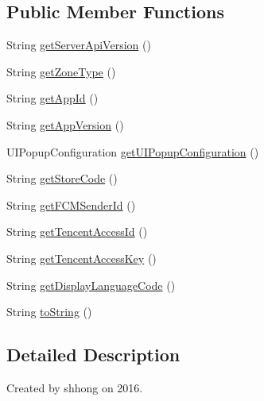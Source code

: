 \subsection*{Public Member Functions}
\begin{DoxyCompactItemize}
\item 
String \hyperlink{classcom_1_1toast_1_1android_1_1gamebase_1_1_gamebase_configuration_af74623fc60ebad6b08ba78668d4961cc}{get\+Server\+Api\+Version} ()
\item 
String \hyperlink{classcom_1_1toast_1_1android_1_1gamebase_1_1_gamebase_configuration_ae87f638a781db3f92a0bbe89bd3a611f}{get\+Zone\+Type} ()
\item 
String \hyperlink{classcom_1_1toast_1_1android_1_1gamebase_1_1_gamebase_configuration_a240d4abd81a68efe7d3b9e10537763f5}{get\+App\+Id} ()
\item 
String \hyperlink{classcom_1_1toast_1_1android_1_1gamebase_1_1_gamebase_configuration_a5344eff846b91c2a48847886ee73800f}{get\+App\+Version} ()
\item 
U\+I\+Popup\+Configuration \hyperlink{classcom_1_1toast_1_1android_1_1gamebase_1_1_gamebase_configuration_a4d2e405317c20f14c144b6748a6e998a}{get\+U\+I\+Popup\+Configuration} ()
\item 
String \hyperlink{classcom_1_1toast_1_1android_1_1gamebase_1_1_gamebase_configuration_ac53dc9a5d7c5e8a4aa816b4476a8c93f}{get\+Store\+Code} ()
\item 
String \hyperlink{classcom_1_1toast_1_1android_1_1gamebase_1_1_gamebase_configuration_a16a632ddb686090e7c21ecdc727414eb}{get\+F\+C\+M\+Sender\+Id} ()
\item 
String \hyperlink{classcom_1_1toast_1_1android_1_1gamebase_1_1_gamebase_configuration_ad3bd019dea776f3b49d1f7f3e0fe2157}{get\+Tencent\+Access\+Id} ()
\item 
String \hyperlink{classcom_1_1toast_1_1android_1_1gamebase_1_1_gamebase_configuration_ac3f77aa86c99c8d53555859211a9f76d}{get\+Tencent\+Access\+Key} ()
\item 
String \hyperlink{classcom_1_1toast_1_1android_1_1gamebase_1_1_gamebase_configuration_a2cbab9a001e124c2ad4b9815db0f3012}{get\+Display\+Language\+Code} ()
\item 
String \hyperlink{classcom_1_1toast_1_1android_1_1gamebase_1_1_gamebase_configuration_ad146fa8579a5f8a876c4688cc5a68520}{to\+String} ()
\end{DoxyCompactItemize}


\subsection{Detailed Description}
Created by shhong on 2016. 


